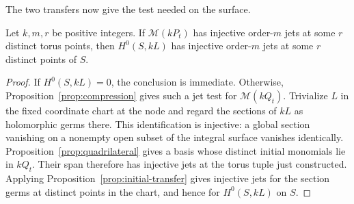 The two transfers now give the test needed on the surface.

\begin{corollary}
\label{cor:surface-transfer}
Let $k,m,r$ be positive integers.  If $\mathcal M(kP_t)$ has injective
order-$m$ jets at some $r$ distinct torus points, then $H^0(S,kL)$ has
injective order-$m$ jets at some $r$ distinct points of $S$.
\end{corollary}

\begin{proof}
If $H^0(S,kL)=0$, the conclusion is immediate.  Otherwise,
Proposition~\ref{prop:compression} gives such a jet test for
$\mathcal M(kQ_t)$.  Trivialize $L$ in the fixed coordinate chart at
the node and regard the sections of $kL$ as holomorphic germs there.
This identification is injective: a global section vanishing on a
nonempty open subset of the integral surface vanishes identically.
Proposition~\ref{prop:quadrilateral} gives a basis whose distinct
initial monomials lie in $kQ_t$.  Their span therefore has injective
jets at the torus tuple just constructed.  Applying
Proposition~\ref{prop:initial-transfer} gives injective jets for the
section germs at distinct points in the chart, and hence for
$H^0(S,kL)$ on $S$.
\end{proof}
